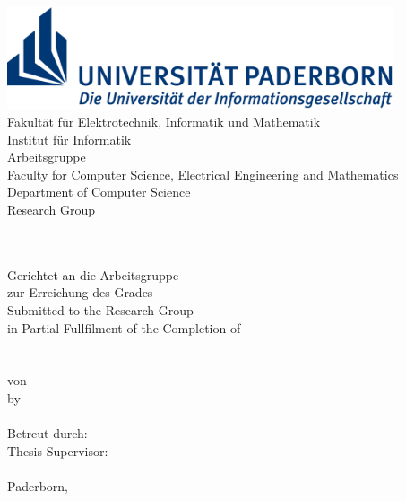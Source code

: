 \begin{titlepage}
	\begin{center}
		\begin{minipage}{135mm}
			\includegraphics[height=30mm]{figures/uni-logo}\\
			\ifgerman
				\textsf{
					\hspace*{20mm} Fakultät für Elektrotechnik,
					Informatik und Mathematik \\
					\hspace*{20mm} Institut für Informatik \\
					\hspace*{20mm} Arbeitsgruppe \theresearchgroup{} \\
				}
			\else
				\textsf{
					\hspace*{20mm} Faculty for Computer Science, 
					Electrical Engineering and Mathematics \\
					\hspace*{20mm} Department of Computer Science \\
					\hspace*{20mm} Research Group \theresearchgroup{} \\
				}
			\fi 
		\end{minipage}\\[40pt]

		{\huge \thethesistype{}}\\[5pt]
		\ifgerman
			Gerichtet an die Arbeitsgruppe \theresearchgroup{}\\
			zur Erreichung des Grades\\[5pt]
		\else
			Submitted to the \theresearchgroup{} Research Group\\
			in Partial Fullfilment of the Completion of\\[5pt]
		\fi 
		{\huge \thedegree{}}\\[30pt]

		{\Huge\textbf{\thetitle{}}}\\[30pt]

		\ifgerman
			von\\
		\else
			by\\
		\fi 
		{\Large\textsc{\theauthor{}}}\\[30pt]

		\ifgerman
			Betreut durch:\\
		\else
			Thesis Supervisor:\\
		\fi 
		{\large \thesupervisor{}}\\[30pt]

		Paderborn, \thesubmissiondate{}
	\end{center}
\end{titlepage}
